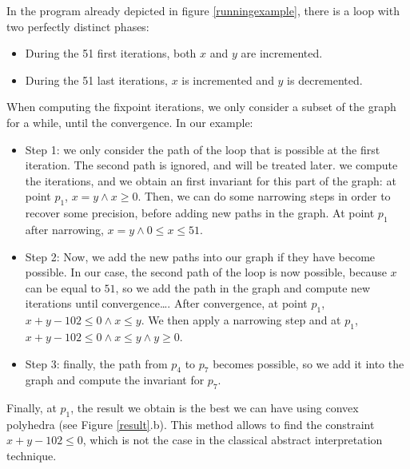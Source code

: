 \documentclass[a4paper,english,titlepage,11pt]{article}
\begin{document}
In the program already depicted in figure \ref{runningexample}, there is a loop
with two perfectly distinct phases:
\begin{itemize}
\item During the 51 first iterations, both $x$ and $y$ are incremented.
\item During the 51 last iterations, $x$ is incremented and $y$ is decremented.
\end{itemize}

When computing the fixpoint iterations, we only consider a subset of the graph
for a while, until the convergence. In our example:
\begin{itemize}
\item Step 1:
	we only consider the path of
	the loop that is possible at the first iteration. The second path is
	ignored, and will be treated later. we compute the iterations, and we obtain
	an first invariant for this part of the graph: at point $p_1$, $x =
	y \wedge x \geq 0$.
	Then, we can do some
	narrowing steps in order to recover some precision, before adding new paths
	in the graph. At point $p_1$ after narrowing, $x=y \wedge 0 \leq x \leq 51$.
\item Step 2:
	Now, we add the new paths into our graph if they have become possible. In
	our case, the second path of the loop is now possible, because $x$ can be
	equal to $51$, so we add the path in
	the graph and compute new iterations until convergence\dots. After
	convergence, at point $p_1$, $x + y - 102 \leq 0 \wedge x
	\leq y$. We then apply a narrowing step and at $p_1$, 
$x + y - 102 \leq 0 \wedge x \leq y \wedge y \geq 0$.
\item Step 3: finally, the path from $p_4$ to $p_7$ becomes possible, so we add
it into the graph and compute the invariant for $p_7$.
\end{itemize}

Finally, at $p_1$, the result we obtain is the best we can have using convex
polyhedra (see Figure \ref{result}.b). This method allows to find the
constraint $x + y - 102 \leq 0$, which is not the case in the classical abstract
interpretation technique.
\end{document}
